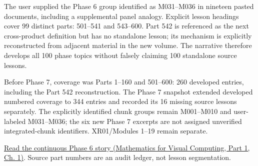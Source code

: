 \hypertarget{appendix-fd090d982a15-phase-6---parts-501-600}{}

The user supplied the Phase 6 group identified as M031--M036 in nineteen pasted documents, including a supplemental panel analogy. Explicit lesson headings cover 99 distinct parts: 501--541 and 543--600. Part 542 is referenced as the next cross-product definition but has no standalone lesson; its mechanism is explicitly reconstructed from adjacent material in the new volume. The narrative therefore develops all 100 phase topics without falsely claiming 100 standalone source lessons.

Before Phase 7, coverage was Parts 1--160 and 501--600: 260 developed entries, including the Part 542 reconstruction. The Phase 7 snapshot extended developed numbered coverage to 344 entries and recorded its 16 missing source lessons separately. The explicitly identified chunk groups remain M001--M010 and user-labeled M031--M036; the six new Phase 7 excerpts are not assigned unverified integrated-chunk identifiers. XR01/Modules 1--19 remain separate.

\href{../02-Mathematics-for-Visual-Computing-P01/main.pdf\#01-foundations-i-ch017-the-panel-gives-us-a-reason-to-learn}{Read the continuous Phase 6 story (Mathematics for Visual Computing, Part 1, Ch. 1)}. Source part numbers are an audit ledger, not lesson segmentation.

